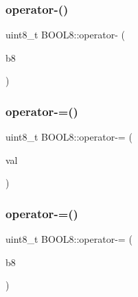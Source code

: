 \hypertarget{struct_b_o_o_l8_abdda05d69009981fd146b5a8d266832a}{}\label{struct_b_o_o_l8_abdda05d69009981fd146b5a8d266832a} 
\subsubsection{\texorpdfstring{operator-\/()}{operator-()}\hspace{0.1cm}{\footnotesize\ttfamily [2/2]}}
{\footnotesize\ttfamily uint8\+\_\+t B\+O\+O\+L8\+::operator-\/ (\begin{DoxyParamCaption}\item[{const \hyperlink{struct_b_o_o_l8}{B\+O\+O\+L8}}]{b8 }\end{DoxyParamCaption})\hspace{0.3cm}{\ttfamily [inline]}}

\hypertarget{struct_b_o_o_l8_a32a5e5741398f2552a7f95ea0804e519}{}\label{struct_b_o_o_l8_a32a5e5741398f2552a7f95ea0804e519} 
\subsubsection{\texorpdfstring{operator-\/=()}{operator-=()}\hspace{0.1cm}{\footnotesize\ttfamily [1/2]}}
{\footnotesize\ttfamily uint8\+\_\+t B\+O\+O\+L8\+::operator-\/= (\begin{DoxyParamCaption}\item[{const uint8\+\_\+t}]{val }\end{DoxyParamCaption})\hspace{0.3cm}{\ttfamily [inline]}}

\hypertarget{struct_b_o_o_l8_aa9b8ccd944e3c23788cd017337d1f444}{}\label{struct_b_o_o_l8_aa9b8ccd944e3c23788cd017337d1f444} 
\subsubsection{\texorpdfstring{operator-\/=()}{operator-=()}\hspace{0.1cm}{\footnotesize\ttfamily [2/2]}}
{\footnotesize\ttfamily uint8\+\_\+t B\+O\+O\+L8\+::operator-\/= (\begin{DoxyParamCaption}\item[{const \hyperlink{struct_b_o_o_l8}{B\+O\+O\+L8}}]{b8 }\end{DoxyParamCaption})\hspace{0.3cm}{\ttfamily [inline]}}

